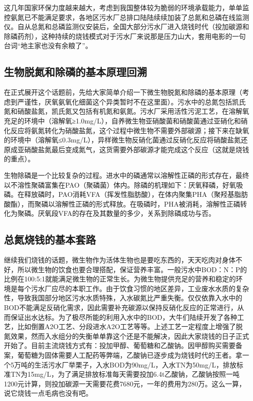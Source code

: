 \documentclass[]{book}
\begin{document}
这几年国家环保力度越来越大，考虑到我国整体较为脆弱的环境承载能力，单单监控氨氮已不能满足要求，各地区污水厂总排口陆陆续续加装了总氮和总磷在线监测仪。自从总氮和总磷监测仪安装后，全国大部分污水厂进入烧钱时代（投加碳源和除磷药剂），这种持续的烧钱模式对于污水厂来说那是压力山大，套用电影的一句台词``地主家也没有余粮了''。

\hypertarget{ux751fux7269ux8131ux6c2eux548cux9664ux78f7ux7684ux57faux672cux539fux7406ux56deux6eaf}{%
\subsection{生物脱氮和除磷的基本原理回溯}\label{ux751fux7269ux8131ux6c2eux548cux9664ux78f7ux7684ux57faux672cux539fux7406ux56deux6eaf}}

在正式展开这个话题前，先给大家简单介绍一下微生物脱氮和除磷的基本原理（考虑到严谨性，厌氧氨氧化细菌这个异类暂时不在这里面）。污水中的总氮包括凯氏氮和硝酸盐氮，凯氏氮又包括有机氮和氨氮。污水厂采用活性污泥工艺，在溶解氧充足的环境中（溶解氧≥1.0mg/L），自养微生物亚硝酸菌和硝酸菌通过亚硝化和硝化反应将氨氮转化为硝酸盐氮，这个过程中微生物不需要外部碳源；接下来在缺氧的环境中（溶解氧≤0.3mg/L），异样微生物反硝化菌通过反硝化反应将硝酸盐氮还原成亚硝酸盐氮最后变成氮气，这货需要外部碳源才能完成这个反应（这就是烧钱的重点）。

生物除磷是一个比较复杂的过程。进水中的磷通常以溶解性正磷的形式存在，最终以不溶性聚磷富集在PAO（聚磷菌）体内。除磷的机理如下：厌氧释磷，好氧吸磷。在释放磷时，PAO消耗VFA（挥发性脂肪酸），在体内聚集PHA（聚羟基脂肪酸酯），而聚磷以溶解性正磷的形式释放。在吸磷时，PHA被消耗，溶解性正磷转化为聚磷。厌氧段VFA的存在及其数量的多少，关系到除磷成功与否。

\hypertarget{ux603bux6c2eux70e7ux94b1ux7684ux57faux672cux5957ux8def}{%
\subsection{总氮烧钱的基本套路}\label{ux603bux6c2eux70e7ux94b1ux7684ux57faux672cux5957ux8def}}

继续我们烧钱的话题，微生物作为活体生物也是要吃东西的，天天吃肉对身体不好，所以微生物的饮食也要合理搭配，保证营养丰富。一般污水中BOD：N：P的比例在100:5:1就能满足微生物的正常生长。为微生物提供充足的营养和稳定的环境是每个污水厂应尽的本职工作。由于饮食习惯的地区差异，工业废水水质的复杂性，导致我国部分地区污水水质特殊，入水碳氮比严重失衡。仅仅依靠入水中的BOD不能满足反硝化需求，因此需要补充碳源以保持反硝化反应的正常进行，从而保证出水达标。为了极尽所能的利用入水中的BOD，大牛们陆续开发了各种工艺，比如倒置A2O工艺、分段进水A2O工艺等等。上述工艺一定程度上增强了脱氮效果，然而入水组分的失衡单单靠这个还是不能解决，因此大家烧钱的日子正式开始了。目前主流烧钱方式有：投加甲醇、葡萄糖和乙酸钠。因甲醇购买需要备案，葡萄糖为固体需要人工配药等弊端，乙酸钠已逐步成为烧钱时代的王者。拿一个5万吨的生活污水厂举栗子，入水BOD为90mg/L，入水TN为50mg/L，排放标准TN为15mg/L，为了满足排放标准每天需要投加6.4t乙酸钠，乙酸钠按照一吨1200元计算，则投加碳源一天需要花费7680元，一年的费用为280万。这么一算，说它烧钱一点毛病也没有吧。
\end{document}
